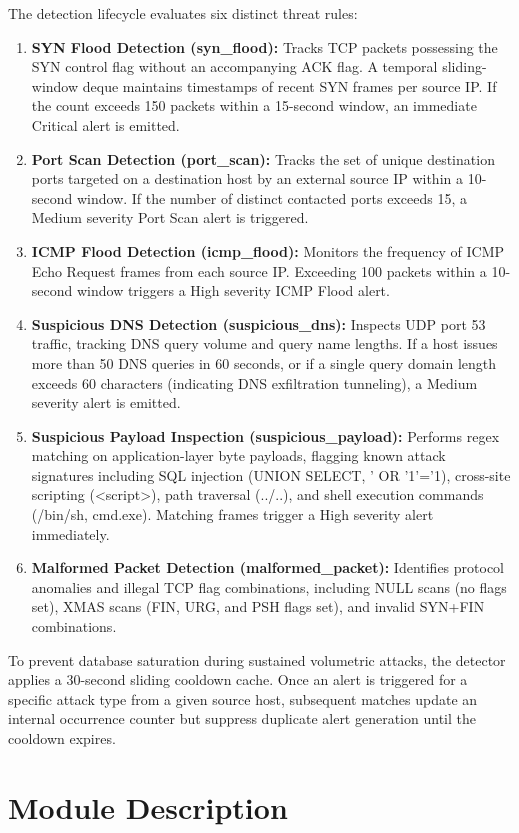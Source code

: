 \documentclass[a4paper,12pt]{report}
\begin{document}
	The detection lifecycle evaluates six distinct threat rules:
	\begin{enumerate}
		\item \textbf{SYN Flood Detection (syn\_flood):} Tracks TCP packets possessing the SYN control flag without an accompanying ACK flag. A temporal sliding-window deque maintains timestamps of recent SYN frames per source IP. If the count exceeds 150 packets within a 15-second window, an immediate Critical alert is emitted.
		\item \textbf{Port Scan Detection (port\_scan):} Tracks the set of unique destination ports targeted on a destination host by an external source IP within a 10-second window. If the number of distinct contacted ports exceeds 15, a Medium severity Port Scan alert is triggered.
		\item \textbf{ICMP Flood Detection (icmp\_flood):} Monitors the frequency of ICMP Echo Request frames from each source IP. Exceeding 100 packets within a 10-second window triggers a High severity ICMP Flood alert.
		\item \textbf{Suspicious DNS Detection (suspicious\_dns):} Inspects UDP port 53 traffic, tracking DNS query volume and query name lengths. If a host issues more than 50 DNS queries in 60 seconds, or if a single query domain length exceeds 60 characters (indicating DNS exfiltration tunneling), a Medium severity alert is emitted.
		\item \textbf{Suspicious Payload Inspection (suspicious\_payload):} Performs regex matching on application-layer byte payloads, flagging known attack signatures including SQL injection (UNION SELECT, ' OR '1'='1), cross-site scripting (<script>), path traversal (../..), and shell execution commands (/bin/sh, cmd.exe). Matching frames trigger a High severity alert immediately.
		\item \textbf{Malformed Packet Detection (malformed\_packet):} Identifies protocol anomalies and illegal TCP flag combinations, including NULL scans (no flags set), XMAS scans (FIN, URG, and PSH flags set), and invalid SYN+FIN combinations.
	\end{enumerate}
	To prevent database saturation during sustained volumetric attacks, the detector applies a 30-second sliding cooldown cache. Once an alert is triggered for a specific attack type from a given source host, subsequent matches update an internal occurrence counter but suppress duplicate alert generation until the cooldown expires.
	
	\section{Module Description}
\end{document}
